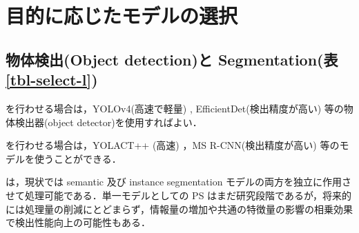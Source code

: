 \documentclass[twocolumn]{jsarticle} %
\begin{document}

\section{目的に応じたモデルの選択}
\subsection{物体検出(Object detection)と Segmentation(表\ref{tbl-select-l})}
を行わせる場合は，YOLOv4(高速で軽量) \cite{BWL20}, EfficientDet(検出精度が高い) \cite{TPL20}等の物体検出器(object detector)を使用すればよい．

を行わせる場合は，YOLACT++ (高速) \cite{BZXL20}，MS R-CNN(検出精度が高い) \cite{HHGHW19} 等のモデルを使うことができる．

は，現状では semantic 及び instance segmentation モデルの両方を独立に作用させて処理可能である．単一モデルとしての PS はまだ研究段階であるが，将来的には処理量の削減にとどまらず，情報量の増加や共通の特徴量の影響の相乗効果で検出性能向上の可能性もある．
\end{document}
